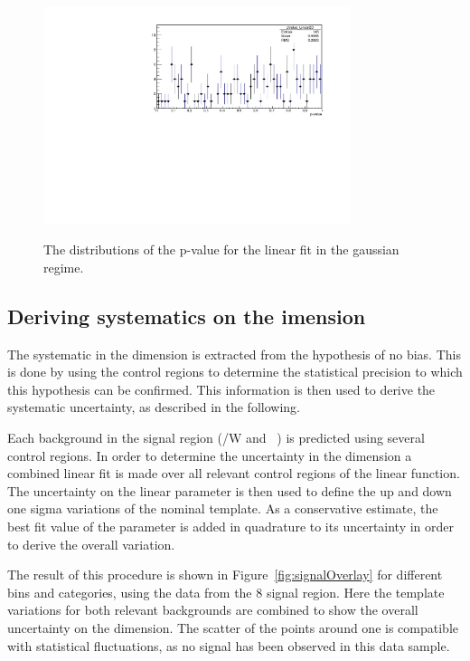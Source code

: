 \begin{figure}[h!]
  \centering
    \includegraphics[width=0.8\textwidth]{figures/template/linear/pValueAll.pdf}
  \\
  \caption{\label{fig:pValues} The distributions of the p-value for the linear fit in the gaussian regime.}
\end{figure}
\subsection{Deriving systematics on the \texorpdfstring{\mht} dimension}
\label{sec:systMhtDimension}
The systematic in the \mht dimension is extracted from the hypothesis
of no bias. This is done by using the control regions 
to determine the statistical precision to which this hypothesis can
be confirmed. This information is then used to derive the systematic 
uncertainty, as described in the following. 

Each background in the signal region (\ttbar/W  and \zInv~) is predicted 
using several control regions. In order to determine the uncertainty in
the \mht dimension a combined linear fit is made over all relevant control regions
of the linear function. The uncertainty on the linear parameter is then
used to define the up and down one sigma variations of the nominal template.
As a conservative estimate, the best fit value of the parameter is 
added in quadrature to its uncertainty in order to derive the overall variation.

The result of this procedure is shown in Figure~\ref{fig:signalOverlay} for different 
\scalht bins and categories, using the data from the 8 \TeV signal region. 
Here the template variations for both relevant backgrounds are combined to show 
the overall uncertainty on the \mht dimension. The scatter of the points around 
one is compatible with statistical fluctuations, 
as no signal has been observed in this data sample.

